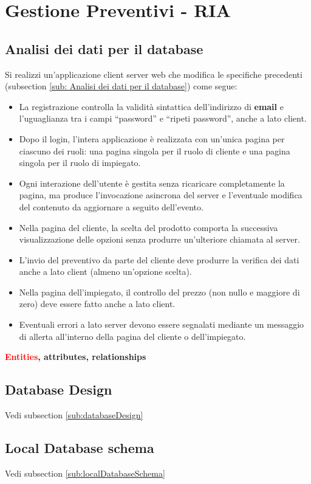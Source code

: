 \documentclass[a4paper, 12pt]{article}
\begin{document}
\newpage
\section{Gestione Preventivi - RIA}
\subsection{Analisi dei dati per il database}
Si realizzi un’applicazione client server web che modifica le specifiche precedenti (subsection \ref{sub: Analisi dei dati per il database}) come segue:
\begin{itemize}
\item La registrazione controlla la validità sintattica dell’indirizzo di \textbf{\textcolor{myGreen}{email}} e l’uguaglianza tra i campi “password” e “ripeti password”, anche a lato client.
\item Dopo il login, l’intera applicazione è realizzata con un’unica pagina per ciascuno dei ruoli: una pagina singola per il ruolo di cliente e una pagina singola per il ruolo di impiegato.
\item Ogni interazione dell’utente è gestita senza ricaricare completamente la pagina, ma produce l’invocazione asincrona del server e l’eventuale modifica del contenuto da aggiornare a seguito dell’evento.
\item Nella pagina del cliente, la scelta del prodotto comporta la successiva visualizzazione delle opzioni senza produrre un’ulteriore chiamata al server.
\item L’invio del preventivo da parte del cliente deve produrre la verifica dei dati anche a lato client (almeno un’opzione scelta).
\item Nella pagina dell’impiegato, il controllo del prezzo (non nullo e maggiore di zero) deve essere fatto anche a lato client.
\item Eventuali errori a lato server devono essere segnalati mediante un messaggio di allerta all’interno della pagina del cliente o dell’impiegato.\\
\end{itemize}
\noindent \textbf{\textcolor{red}{Entities}, \textcolor{myGreen}{attributes}, \textcolor{myBlue}{relationships}}
\subsection{Database Design}
Vedi subsection \ref{sub:databaseDesign}
\subsection{Local Database schema}
Vedi subsection \ref{sub:localDatabaseSchema}
\end{document}
